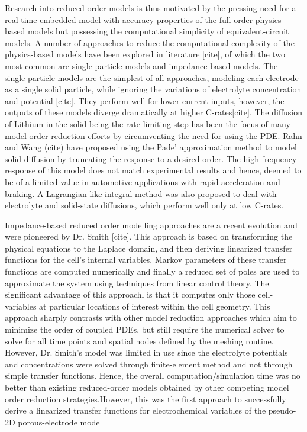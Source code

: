 Research into reduced-order models is thus motivated by the pressing
need for a real-time embedded model with accuracy properties of the full-order
physics based models but possessing the computational simplicity of
equivalent-circuit models. A number of approaches to reduce the computational
complexity of the physics-based models have been explored in literature
{[}cite{]}, of which the two most common are single particle models
and impedance based models. The single-particle models are the simplest
of all approaches, modeling each electrode as a single solid particle,
while ignoring the variations of electrolyte concentration and potential
{[}cite{]}. They perform well for lower current inputs, however, the
outputs of these models diverge dramatically at higher C-rates{[}cite{]}.
The diffusion of Lithium in the solid being the rate-limiting step
has been the focus of many model order reduction efforts by circumventing
the need for using the PDE. Rahn and Wang (cite) have proposed using
the Pade' approximation method to model solid diffusion by truncating
the response to a desired order. The high-frequency response of this
model does not match experimental results and hence, deemed to be
of a limited value in automotive applications with rapid acceleration
and braking. A Lagrangian-like integral method was also proposed to
deal with electrolyte and solid-state diffusions, which perform well
only at low C-rates.

Impedance-based reduced order modelling approaches
are a recent evolution and were pioneered by Dr. Smith {[}cite{]}.
This approach is based on transforming the physical equations to the
Laplace domain, and then deriving linearized transfer functions for
the cell's internal variables. Markov parameters of these transfer
functions are computed numerically and finally a reduced set of poles
are used to approximate the system using techniques from linear control
theory. The significant advantage of this approachl is that it computes
only those cell-variables at particular locations of interest within
the cell geometry. This approach sharply contrasts with other model
reduction approaches which aim to minimize the order of coupled PDEs,
but still require the numerical solver to solve for all time points
and spatial nodes defined by the meshing routine. However, Dr. Smith\textquoteright s
model was limited in use since the electrolyte potentials and concentrations
were solved through finite-element method and not through simple transfer
functions. Hence, the overall computation/simulation time was no better
than existing reduced-order models obtained by other competing model
order reduction strategies.However, this was the first approach to
successfully derive a linearized transfer functions for electrochemical
variables of the pseudo-2D porous-electrode model

